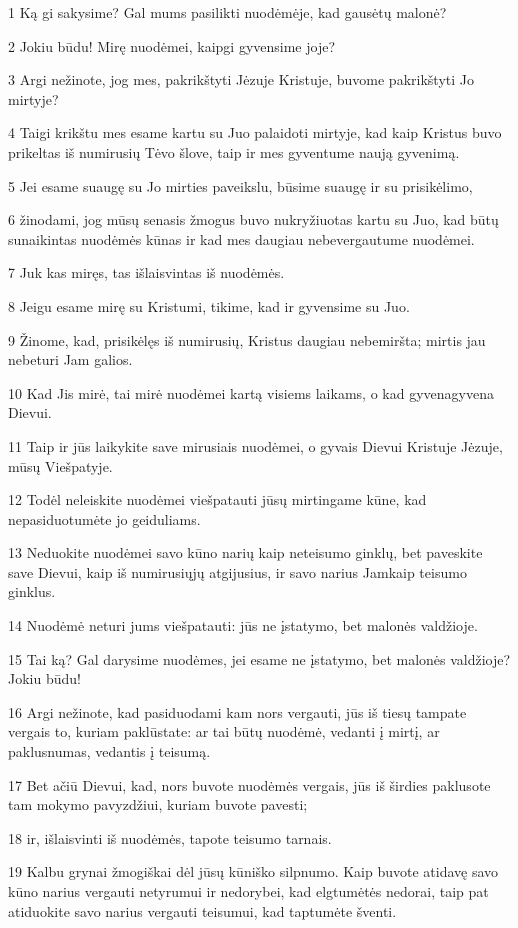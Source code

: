 \par 1 Ką gi sakysime? Gal mums pasilikti nuodėmėje, kad gausėtų malonė? 
\par 2 Jokiu būdu! Mirę nuodėmei, kaipgi gyvensime joje? 
\par 3 Argi nežinote, jog mes, pakrikštyti Jėzuje Kristuje, buvome pakrikštyti Jo mirtyje? 
\par 4 Taigi krikštu mes esame kartu su Juo palaidoti mirtyje, kad kaip Kristus buvo prikeltas iš numirusių Tėvo šlove, taip ir mes gyventume naują gyvenimą. 
\par 5 Jei esame suaugę su Jo mirties paveikslu, būsime suaugę ir su prisikėlimo, 
\par 6 žinodami, jog mūsų senasis žmogus buvo nukryžiuotas kartu su Juo, kad būtų sunaikintas nuodėmės kūnas ir kad mes daugiau nebevergautume nuodėmei. 
\par 7 Juk kas miręs, tas išlaisvintas iš nuodėmės. 
\par 8 Jeigu esame mirę su Kristumi, tikime, kad ir gyvensime su Juo. 
\par 9 Žinome, kad, prisikėlęs iš numirusių, Kristus daugiau nebemiršta; mirtis jau nebeturi Jam galios. 
\par 10 Kad Jis mirė, tai mirė nuodėmei kartą visiems laikams, o kad gyvena­gyvena Dievui. 
\par 11 Taip ir jūs laikykite save mirusiais nuodėmei, o gyvais Dievui Kristuje Jėzuje, mūsų Viešpatyje. 
\par 12 Todėl neleiskite nuodėmei viešpatauti jūsų mirtingame kūne, kad nepasiduotumėte jo geiduliams. 
\par 13 Neduokite nuodėmei savo kūno narių kaip neteisumo ginklų, bet paveskite save Dievui, kaip iš numirusiųjų atgijusius, ir savo narius Jam­kaip teisumo ginklus. 
\par 14 Nuodėmė neturi jums viešpatauti: jūs ne įstatymo, bet malonės valdžioje. 
\par 15 Tai ką? Gal darysime nuodėmes, jei esame ne įstatymo, bet malonės valdžioje? Jokiu būdu! 
\par 16 Argi nežinote, kad pasiduodami kam nors vergauti, jūs iš tiesų tampate vergais to, kuriam paklūstate: ar tai būtų nuodėmė, vedanti į mirtį, ar paklusnumas, vedantis į teisumą. 
\par 17 Bet ačiū Dievui, kad, nors buvote nuodėmės vergais, jūs iš širdies paklusote tam mokymo pavyzdžiui, kuriam buvote pavesti; 
\par 18 ir, išlaisvinti iš nuodėmės, tapote teisumo tarnais. 
\par 19 Kalbu grynai žmogiškai dėl jūsų kūniško silpnumo. Kaip buvote atidavę savo kūno narius vergauti netyrumui ir nedorybei, kad elgtumėtės nedorai, taip pat atiduokite savo narius vergauti teisumui, kad taptumėte šventi. 
